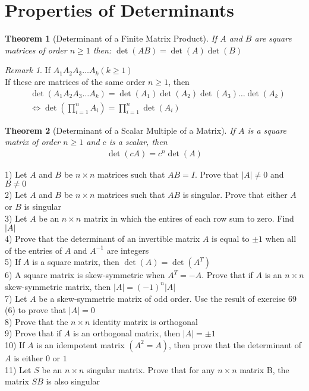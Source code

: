 \documentclass{jhwhw}
\newtheorem{theorem}{Theorem}
\theoremstyle{definition}
\theoremstyle{remark}
\newtheorem*{remark}{Remark}
\theoremstyle{example}
\begin{document}
\section{Properties of Determinants}
\begin{theorem}[Determinant of a Finite Matrix Product] If \(A\) and \(B\) are square matrices of order \(n \geq 1\) then: \(\det(AB) = \det(A) \det(B)\) \end{theorem}
\begin{remark} If \(A_1 A_2 A_3 \ldots A_k (k \geq 1) \)\\
If these are matrices of the same order \(n \geq 1\), then
\begin{align*} & \det (A_1 A_2 A_3 \ldots A_k) = \det (A_1) \det (A_2) \det (A_3) \ldots \det(A_k)\\
 & \Leftrightarrow \det (\prod_{i=1}^{n} A_i) = \prod_{i=1}^{n} \det(A_i) \end{align*}\end{remark}
\begin{theorem}[Determinant of a Scalar Multiple of a Matrix] If \(A\) is a square matrix of order \(n \geq 1\) and \(c\) is a scalar, then
\begin{align*} \det(cA) = c^n \det(A) \end{align*} \end{theorem}
1) Let \(A\) and \(B\) be \(n \times n\) matrices such that \(AB = I\). Prove that \(|A| \neq 0 \) and \(B \neq 0\)\\
2) Let \(A\) and \(B\) be \(n \times n\) matrices such that \(AB\) is singular. Prove that either \(A\) or \(B\) is singular\\
3) Let \(A\) be an \(n \times n\) matrix in which the entires of each row sum to zero. Find \(|A|\)\\
4) Prove that the determinant of an invertible matrix \(A\) is equal to \(\pm 1\) when all of the entries of \(A\) and \(A^{-1}\) are integers\\
5) If \(A\) is a square matrix, then \(\det (A) = \det(A^T)\)\\
6) A square matrix is skew-symmetric when \(A^T = -A\). Prove that if \(A\) is an \(n \times n\) skew-symmetric matrix, then \(|A| = (-1)^n |A|\)\\
7) Let \(A\) be a skew-symmetric matrix of odd order. Use the result of exercise 69 (6) to prove that \(|A| = 0\)\\
8) Prove that the \(n \times n\) identity matrix is orthogonal\\
9) Prove that if \(A\) is an orthogonal matrix, then \(|A| = \pm 1\)\\
10) If \(A\) is an idempotent matrix \((A^2 = A)\), then prove that the determinant of \(A\) is either \(0 \text{ or } 1\)\\
11) Let \(S\) be an \(n \times n\) singular matrix. Prove that for any \(n \times n\) matrix B, the matrix \(SB\) is also singular
\end{document}
